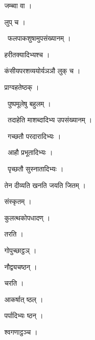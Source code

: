 \documentclass[10pt, openany, oneside]{book}
\begin{document}
\noindent जम्ब्वा वा ।

\noindent लुप् च ।

\par\noindent\hspace{1.5em}{\vps वा॰}~{\qt फलपाकशुषामुपसंख्यानम् ।}

\noindent हरीतक्यादिभ्यश्च ।

\noindent कंसीयपरशव्ययोर्यञञौ लुक् च ।

\noindent प्राग्वहतेष्ठक् ।

\par\noindent\hspace{1.5em}{\vps वा॰}~{\qt पुष्पमूलेषु बहुलम् ।}

\par\noindent\hspace{1.5em}{\vps वा॰}~{\qt तदाहेति माशब्दादिभ्य उपसंख्यानम् ।}

\par\noindent\hspace{1.5em}{\vps वा॰}~{\qt गच्छतौ परदारादिभ्यः ।}

\par\noindent\hspace{1.5em}{\vps वा॰}~{\qt आहौ प्रभूतादिभ्यः ।}

\par\noindent\hspace{1.5em}{\vps वा॰}~{\qt पृच्छतौ सुस्नातादिभ्यः ।}

\noindent तेन दीव्यति खनति जयति जितम् ।

\noindent संस्कृतम् ।

\noindent कुलत्थकोपधादण् ।

\noindent तरति ।

\noindent गोपुच्छाट्ठञ् ।

\noindent नौद्व्यचष्ठन् ।

\noindent चरति ।

\noindent आकर्षात् ष्ठल् ।

\noindent पर्पादिभ्यः ष्ठन् ।

\noindent श्वगणाट्ठञ्च ।
\end{document}
